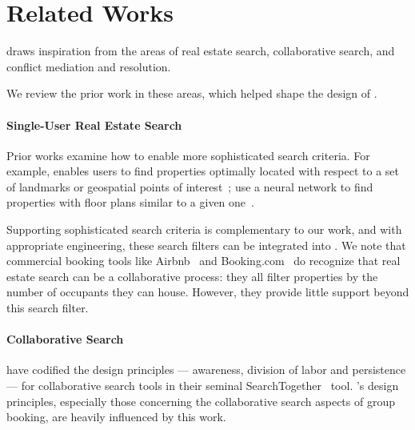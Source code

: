 \section{ Related Works}




\tool draws inspiration from the areas of real estate search, collaborative search, and conflict mediation and resolution. 


We review the prior work in these areas, which helped shape the design of \tool. 

\paragraph{Single-User Real Estate Search}

Prior works examine how to enable more sophisticated search criteria. For example, \citeauthor{lookupia} enables users to find properties optimally located with respect to a set of landmarks or geospatial points of interest~\cite{lookupia}; \citeauthor{floornet} use a neural network to find properties with floor plans similar to a given one~\cite{floornet}.  

Supporting sophisticated search criteria is complementary to our work, and with appropriate engineering, these search filters can be integrated into \tool.
We note that commercial booking tools like Airbnb~\cite{airbnb} and Booking.com~\cite{booking} do recognize that real estate search can be a collaborative process: they all filter properties by the number of occupants they can house. However, they provide little support beyond this search filter.

 

\paragraph{Collaborative Search}
\citeauthor{searchtogether} have codified the design principles --- awareness, division of labor and persistence --- for collaborative search tools in their seminal SearchTogether~\cite{searchtogether} tool. \tool's design principles, especially those concerning the collaborative search aspects of group booking, are heavily influenced by this work.

